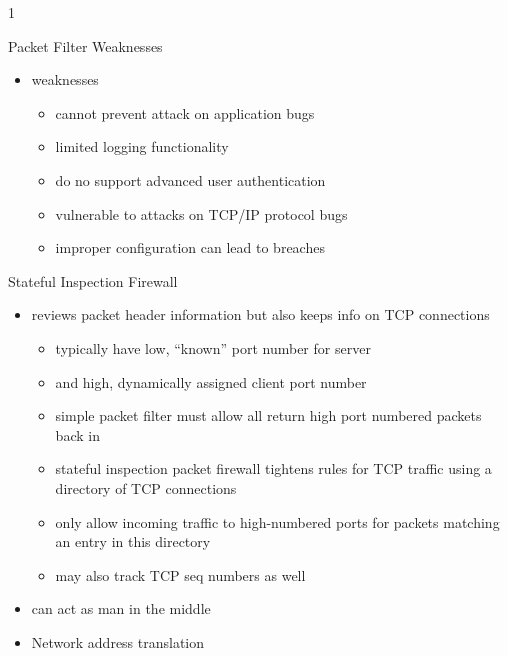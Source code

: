 1\documentclass{beamer}
\begin{document}
\begin{frame}{Packet Filter Weaknesses}
  \begin{itemize}
  \item weaknesses 
    \begin{itemize}
    \item cannot prevent attack on application bugs 
    \item limited logging functionality 
    \item do no support advanced user authentication 
    \item vulnerable to attacks on TCP/IP protocol bugs 
    \item improper configuration can lead to breaches
    \end{itemize}
  \end{itemize}
\end{frame}

\begin{frame}{Stateful Inspection Firewall}
  \begin{itemize}
  \item reviews packet header information but also keeps 
    info on TCP connections 
    \begin{itemize}
    \item typically have low, ``known'' port number for server 
    \item and high, dynamically assigned client port number
    \item simple packet filter must allow all return high port 
      numbered packets back in 
    \item stateful inspection packet firewall tightens rules for TCP 
      traffic using a directory of TCP connections 
    \item only allow incoming traffic to high-numbered ports for 
      packets matching an entry in this directory 
    \item may also track TCP seq numbers as well
    \end{itemize}
  \item can act as man in the middle
  \item Network address translation
  \end{itemize}
\end{frame}
\end{document}
